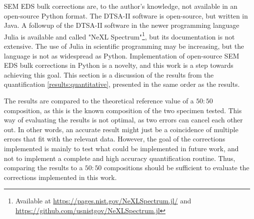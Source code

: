 

SEM EDS bulk corrections are, to the author's knowledge, not available in an open-source Python format.
The DTSA-II software is open-source, but written in Java.
A followup of the DTSA-II software in the newer programming language Julia is available and called "NeXL Spectrum"\footnote{Available at \url{https://pages.nist.gov/NeXLSpectrum.jl/} and \url{https://github.com/usnistgov/NeXLSpectrum.jl}}, but its documentation is not extensive.
The use of Julia in scientific programming may be increasing, but the language is not as widespread as Python.
Implementation of open-source SEM EDS bulk corrections in Python is a novelty, and this work is a step towards achieving this goal.
This section is a discussion of the results from the quantification \cref{results:quantitative}, presented in the same order as the results.



The results are compared to the theoretical reference value of a $50:50$ composition, as this is the known composition of the two specimen tested.
This way of evaluating the results is not optimal, as two errors can cancel each other out.
In other words, an accurate result might just be a coincidence of multiple errors that fit with the relevant data.
However, the goal of the corrections implemented is mainly to test what could be implemented in future work, and not to implement a complete and high accuracy quantification routine.
Thus, comparing the results to a $50:50$ compositions should be sufficient to evaluate the corrections implemented in this work.











